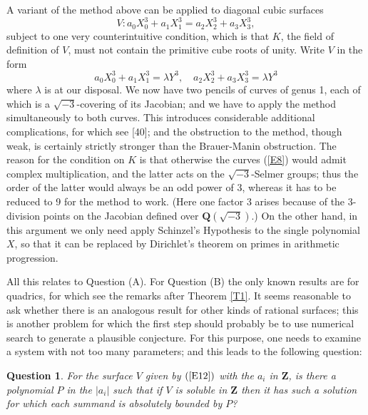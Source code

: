 \documentclass[12pt]{article}
\def\bQ{{\mathbf Q}}
\def\bZ{{\mathbf Z}}
\def\gl{{\lambda}}
\def\beq{\begin{equation} \label}
\def\bpr{\begin{question} \label}
\def\epr{\end{question}}
\newtheorem{question}{Question}
\begin{document}
A variant of the method above can be applied to diagonal cubic surfaces
\beq{E12} V:a_0X_0^3+a_1X_1^3=a_2X_2^3+a_3X_3^3, \end{equation}
subject to one very counterintuitive condition, which is that $K$, the field of
definition of $V$, must not contain the primitive cube roots of unity.
Write $V$ in the form
\beq{E8} a_0X_0^3+a_1X_1^3=\gl Y^3, \quad a_2X_2^3+a_3X_3^3=\gl Y^3
\end{equation}
where $\gl$ is at our disposal. We now have two pencils of
curves of genus 1, each of which is a $\sqrt{-3}$-covering
of its Jacobian; and we have to apply the method simultaneously to both
curves. This introduces considerable additional complications, for which
see [40]; and the obstruction to the method, though weak, is certainly
strictly stronger than the Brauer-Manin obstruction. The reason for the
condition on $K$ is that otherwise the curves (\ref{E8}) would admit complex
multiplication, and the latter acts on the $\sqrt{-3}$-Selmer groups; thus the
order of the latter would always be an odd power of 3, whereas it has to be
reduced to 9 for the method to work. (Here one factor 3 arises because of the
3-division points on the Jacobian defined over $\bQ(\sqrt{-3})$.) On the other
hand, in this argument we only need apply
Schinzel's Hypothesis to the single polynomial $X$, so that it can be replaced
by Dirichlet's theorem on primes in arithmetic progression.

All this relates to Question (A). For Question (B) the only known results
are for quadrics, for which see the remarks after Theorem \ref{T1}. It seems
reasonable to ask whether there is an analogous result for other kinds of
rational surfaces; this is another problem for which the first step should
probably be to use numerical search to generate a plausible conjecture. For
this purpose, one needs to examine a system with not too many parameters;
and this leads to the following question:
\bpr{Q9} For the surface $V$ given by $(\ref{E12})$ with the $a_i$ in $\bZ$,
is there a polynomial $P$ in the $|a_i|$ such that if $V$ is soluble in $\bZ$
then it has such a solution for which each summand is absolutely bounded by
$P$?
\epr
\end{document}
